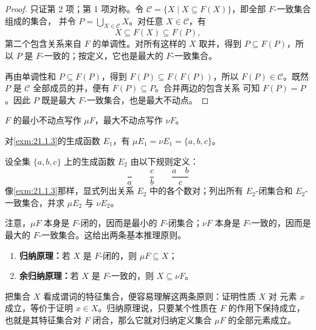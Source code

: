 \begin{proof}
只证第 2 项；第 1 项对称。令
\(\mathcal C=\{X\mid X\subseteq F(X)\}\)，即全部 \(F\)-一致集合组成的集合，
并令 \(P=\bigcup_{X\in\mathcal C}X\)。对任意 \(X\in\mathcal C\)，有
\[
X\subseteq F(X)\subseteq F(P),
\]
第二个包含关系来自 \(F\) 的单调性。对所有这样的 \(X\) 取并，得到
\(P\subseteq F(P)\)，所以 \(P\) 是 \(F\)-一致的；按定义，它也是最大的
\(F\)-一致集合。

再由单调性和 \(P\subseteq F(P)\)，得到
\(F(P)\subseteq F(F(P))\)，所以 \(F(P)\in\mathcal C\)。既然 \(P\) 是
\(\mathcal C\) 全部成员的并，便有 \(F(P)\subseteq P\)。合并两边的包含关系
可知 \(F(P)=P\)。因此 \(P\) 既是最大 \(F\)-一致集合，也是最大不动点。
\end{proof}

\begin{definition}
\label{def:21.1.5}
\(F\) 的最小不动点写作 \(\mu F\)，最大不动点写作 \(\nu F\)。
\end{definition}

\begin{example}
对\cref{exm:21.1.3}的生成函数 \(E_1\)，有
\(\mu E_1=\nu E_1=\{a,b,c\}\)。
\end{example}

\begin{exercise}[\(\star\)]
\label{ex:21.1.7}
设全集 \(\{a,b,c\}\) 上的生成函数 \(E_2\) 由以下规则定义：
\[
\frac{}{a}
\qquad
\frac{c}{b}
\qquad
\frac{a\quad b}{c}
\]
像\cref{exm:21.1.3}那样，显式列出关系 \(E_2\) 中的各个数对；列出所有
\(E_2\)-闭集合和 \(E_2\)-一致集合，并求 \(\mu E_2\) 与 \(\nu E_2\)。
\end{exercise}

注意，\(\mu F\) 本身是 \(F\)-闭的，因而是最小的 \(F\)-闭集合；\(\nu F\)
本身是 \(F\)-一致的，因而是最大的 \(F\)-一致集合。这给出两条基本推理原则。

\taplstatementliststart
\begin{corollary}
\label{cor:21.1.8}
\taplstatementlistbreak
\begin{enumerate}
  \item \textbf{归纳原理：}若 \(X\) 是 \(F\)-闭的，则 \(\mu F\subseteq X\)；
  \item \textbf{余归纳原理：}若 \(X\) 是 \(F\)-一致的，则 \(X\subseteq\nu F\)。
\end{enumerate}
\end{corollary}

把集合 \(X\) 看成谓词的特征集合，便容易理解这两条原则：证明性质 \(X\) 对
元素 \(x\) 成立，等价于证明 \(x\in X\)。归纳原理说，只要某个性质在 \(F\)
的作用下保持成立，也就是其特征集合对 \(F\) 闭合，那么它就对归纳定义集合
\(\mu F\) 的全部元素成立。

